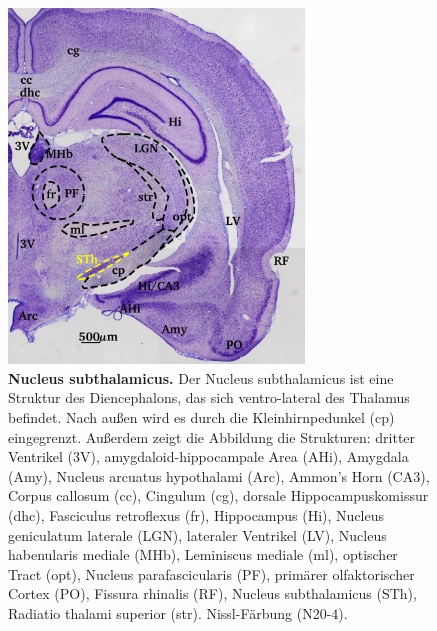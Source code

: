 \documentclass[12pt,a4paper,pdftex]{article}
\begin{document}
\begin{figure}[H]
    \centering
    \includegraphics[width=0.7\textwidth]{pictures/Basalganglia/Nucleus_subthalamus.png}
    \caption[Nucleus subthalamicus]{\textbf{Nucleus subthalamicus.} Der Nucleus subthalamicus ist eine Struktur des Diencephalons, das sich ventro-lateral des Thalamus befindet. Nach außen wird es durch die Kleinhirnpedunkel (cp) eingegrenzt. Außerdem zeigt die Abbildung die Strukturen: dritter Ventrikel (3V), amygdaloid-hippocampale Area (AHi), Amygdala (Amy), Nucleus arcuatus hypothalami (Arc), Ammon's Horn (CA3), Corpus callosum (cc), Cingulum (cg), dorsale Hippocampuskomissur (dhc), Fasciculus retroflexus (fr), Hippocampus (Hi), Nucleus geniculatum laterale (LGN), lateraler Ventrikel (LV), Nucleus habenularis mediale (MHb), Leminiscus mediale (ml), optischer Tract (opt), Nucleus parafascicularis (PF),  primärer  olfaktorischer  Cortex (PO), Fissura rhinalis (RF), Nucleus subthalamicus (STh), Radiatio thalami superior (str). Nissl-Färbung (N20-4).}
    \label{fig:Nucleus_subthalamus}
\end{figure}
\end{document}
